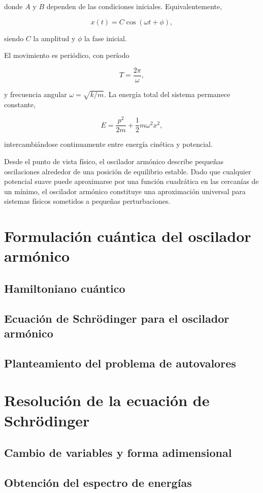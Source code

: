 \documentclass[11pt,a4paper,spanish]{book}
\begin{document}
donde $A$ y $B$ dependen de las condiciones iniciales. 
Equivalentemente,

\[
x(t) = C \cos(\omega t + \phi),
\]

siendo $C$ la amplitud y $\phi$ la fase inicial.

El movimiento es periódico, con período

\[
T = \frac{2\pi}{\omega},
\]

y frecuencia angular $\omega = \sqrt{k/m}$. 
La energía total del sistema permanece constante,

\[
E = \frac{p^2}{2m} + \frac{1}{2}m\omega^2 x^2,
\]

intercambiándose continuamente entre energía cinética y potencial.

Desde el punto de vista físico, el oscilador armónico describe pequeñas oscilaciones alrededor de una posición de equilibrio estable. 
Dado que cualquier potencial suave puede aproximarse por una función cuadrática en las cercanías de un mínimo, el oscilador armónico constituye una aproximación universal para sistemas físicos sometidos a pequeñas perturbaciones.

\section{Formulación cuántica del oscilador armónico}
\subsection{Hamiltoniano cuántico}
\subsection{Ecuación de Schrödinger para el oscilador armónico}
\subsection{Planteamiento del problema de autovalores}

\section{Resolución de la ecuación de Schrödinger}
\subsection{Cambio de variables y forma adimensional}
\subsection{Obtención del espectro de energías}
\end{document}
